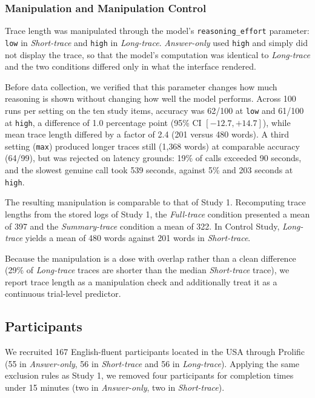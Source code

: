 \documentclass[manuscript,review,anonymous]{acmart}
\begin{document}
\subsubsection{Manipulation and Manipulation Control}
Trace length was manipulated through the model's \texttt{reasoning\_effort}
parameter: \texttt{low} in \textit{Short-trace} and \texttt{high} in
\textit{Long-trace}. \textit{Answer-only} used \texttt{high} and simply did not
display the trace, so that the model's computation was identical to
\textit{Long-trace} and the two conditions differed only in what the interface
rendered.

Before data collection, we verified that this parameter changes how much reasoning
is shown without changing how well the model performs. Across 100 runs per
setting on the ten study items, accuracy was 62/100 at \texttt{low} and 61/100 at
\texttt{high}, a difference of 1.0 percentage point (95\% CI $[-12.7, +14.7]$),
while mean trace length differed by a factor of 2.4 (201 versus 480 words). A
third setting (\texttt{max}) produced longer traces still (1{,}368 words) at
comparable accuracy (64/99), but was rejected on latency grounds: 19\% of calls
exceeded 90 seconds, and the slowest genuine call took 539 seconds, against 5\%
and 203 seconds at \texttt{high}.

The resulting manipulation is comparable to that of Study 1. Recomputing
trace lengths from the stored logs of Study 1, the \textit{Full-trace} condition
presented a mean of 397 and the \textit{Summary-trace} condition a mean of 322. In Control Study, \textit{Long-trace} yields a mean of 480 words against 201 words in
\textit{Short-trace}.

Because the manipulation is a dose with overlap rather than a clean difference
(29\% of \textit{Long-trace} traces are shorter than the median
\textit{Short-trace} trace), we report trace length as a manipulation check and
additionally treat it as a continuous trial-level predictor.


\subsection{Participants}

We recruited 167 English-fluent participants located in the USA through Prolific
(55 in \textit{Answer-only}, 56 in \textit{Short-trace} and 56 in
\textit{Long-trace}). Applying the same
exclusion rules as Study 1, we removed four participants for completion times
under 15 minutes (two in \textit{Answer-only}, two in \textit{Short-trace}).
\end{document}
